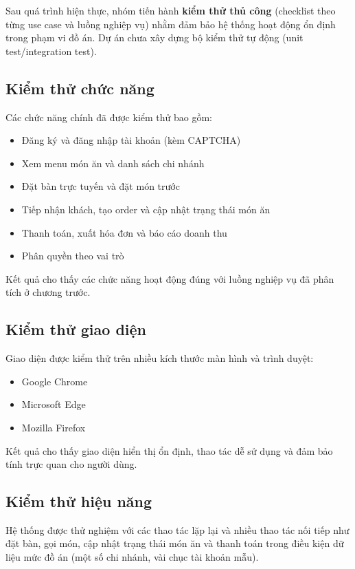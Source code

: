 \documentclass[../DoAn.tex]{subfiles}
\begin{document}
Sau quá trình hiện thực, nhóm tiến hành \textbf{kiểm thử thủ công} (checklist theo từng use case và luồng nghiệp vụ) nhằm đảm bảo hệ thống hoạt động ổn định trong phạm vi đồ án.
Dự án chưa xây dựng bộ kiểm thử tự động (unit test/integration test).

\subsection{Kiểm thử chức năng}

Các chức năng chính đã được kiểm thử bao gồm:
\begin{itemize}
    \item Đăng ký và đăng nhập tài khoản (kèm CAPTCHA)
    \item Xem menu món ăn và danh sách chi nhánh
    \item Đặt bàn trực tuyến và đặt món trước
    \item Tiếp nhận khách, tạo order và cập nhật trạng thái món ăn
    \item Thanh toán, xuất hóa đơn và báo cáo doanh thu
    \item Phân quyền theo vai trò
\end{itemize}

Kết quả cho thấy các chức năng hoạt động đúng với luồng nghiệp vụ đã phân tích ở chương trước.

\subsection{Kiểm thử giao diện}

Giao diện được kiểm thử trên nhiều kích thước màn hình và trình duyệt:
\begin{itemize}
    \item Google Chrome
    \item Microsoft Edge
    \item Mozilla Firefox
\end{itemize}

Kết quả cho thấy giao diện hiển thị ổn định, thao tác dễ sử dụng và đảm bảo tính trực quan cho người dùng.

\subsection{Kiểm thử hiệu năng}

Hệ thống được thử nghiệm với các thao tác lặp lại và nhiều thao tác nối tiếp như đặt bàn, gọi món, cập nhật trạng thái món ăn và thanh toán trong điều kiện dữ liệu mức đồ án (một số chi nhánh, vài chục tài khoản mẫu).
\end{document}
